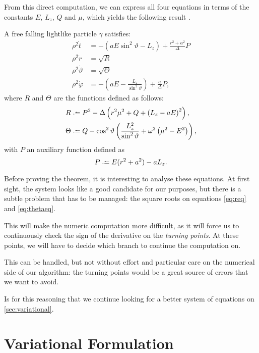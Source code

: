From this direct computation, we can express all four equations in terms of the constants $E$, $L_z$, $Q$ and $\mu$, which yields the following result \cite[p. 899]{thorne73}.

\begin{theorem}
	\label{theo:firsteqs}
	A free falling lightlike particle $\gamma$ satisfies:
	\begin{align}
	\label{eq:teq}
	\rho^2 \dot{t} &=-( aE\sin^2\vartheta - L_z) + \frac{r^2+a^2}{\Delta}P \\
	\label{eq:req}
	\rho^2 \dot{r} &= \sqrt{R} \\
	\label{eq:thetaeq}
	\rho^2 \dot{\vartheta} &= \sqrt{\Theta} \\
	\label{eq:phieq}
	\rho^2 \dot{\varphi} &=-( aE - \frac{L_z}{\sin^2\vartheta}) + \frac{a}{\Delta}P,
	\end{align}
	where $R$ and $\Theta$ are the functions defined as follows:
	\begin{align}
	\label{eq:defR}
	R &\defeq P^2 - \Delta \left( r^2\mu^2 + Q + \left(L_z - aE \right)^2 \right), \\
	\label{eq:defTheta}
	\Theta &\defeq Q - \cos^2\vartheta \left( \frac{L_z^2}{\sin^2\vartheta} + \omega^2\left(\mu^2 - E^2 \right)\right),
	\end{align}
	with $P$ an auxiliary function defined as
	\begin{equation}
	\label{eq:defP}
	P \defeq E(r^2 + a^2) - aL_z.
	\end{equation}
\end{theorem}

Before proving the theorem, it is interesting to analyse these equations. At first sight, the system looks like a good candidate for our purposes, but there is a subtle problem that has to be managed: the square roots on equations \ref{eq:req} and \ref{eq:thetaeq}.

This will make the numeric computation more difficult, as it will force us to continuously check the sign of the derivative on the \emph{turning points}. At these points, we will have to decide which branch to continue the computation on.

This can be handled, but not without effort and particular care on the numerical side of our algorithm: the turning points would be a great source of errors that we want to avoid.

Is for this reasoning that we continue looking for a better system of equations on \autoref{sec:variational}.

\section{Variational Formulation}
\label{sec:variational}

